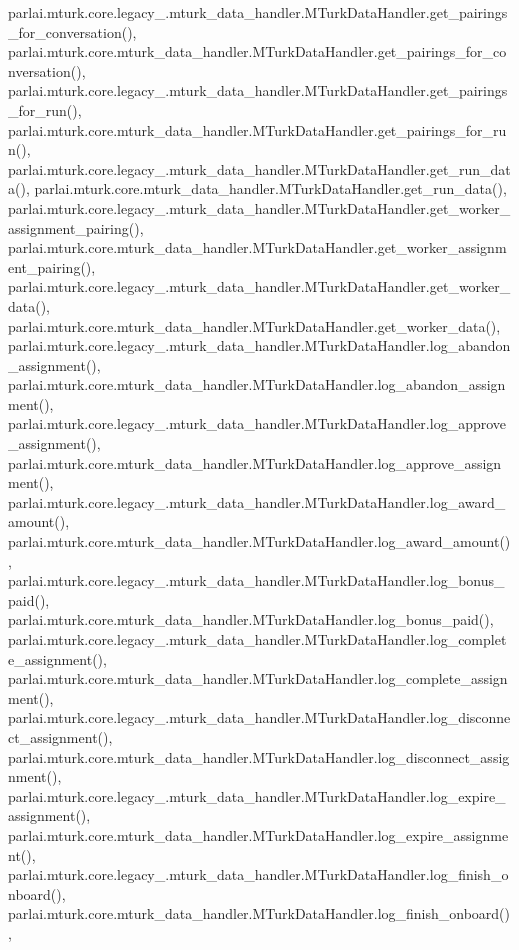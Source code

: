 parlai.\+mturk.\+core.\+legacy\+\_.\+mturk\+\_\+data\+\_\+handler.\+M\+Turk\+Data\+Handler.\+get\+\_\+pairings\+\_\+for\+\_\+conversation(), parlai.\+mturk.\+core.\+mturk\+\_\+data\+\_\+handler.\+M\+Turk\+Data\+Handler.\+get\+\_\+pairings\+\_\+for\+\_\+conversation(), parlai.\+mturk.\+core.\+legacy\+\_.\+mturk\+\_\+data\+\_\+handler.\+M\+Turk\+Data\+Handler.\+get\+\_\+pairings\+\_\+for\+\_\+run(), parlai.\+mturk.\+core.\+mturk\+\_\+data\+\_\+handler.\+M\+Turk\+Data\+Handler.\+get\+\_\+pairings\+\_\+for\+\_\+run(), parlai.\+mturk.\+core.\+legacy\+\_.\+mturk\+\_\+data\+\_\+handler.\+M\+Turk\+Data\+Handler.\+get\+\_\+run\+\_\+data(), parlai.\+mturk.\+core.\+mturk\+\_\+data\+\_\+handler.\+M\+Turk\+Data\+Handler.\+get\+\_\+run\+\_\+data(), parlai.\+mturk.\+core.\+legacy\+\_.\+mturk\+\_\+data\+\_\+handler.\+M\+Turk\+Data\+Handler.\+get\+\_\+worker\+\_\+assignment\+\_\+pairing(), parlai.\+mturk.\+core.\+mturk\+\_\+data\+\_\+handler.\+M\+Turk\+Data\+Handler.\+get\+\_\+worker\+\_\+assignment\+\_\+pairing(), parlai.\+mturk.\+core.\+legacy\+\_.\+mturk\+\_\+data\+\_\+handler.\+M\+Turk\+Data\+Handler.\+get\+\_\+worker\+\_\+data(), parlai.\+mturk.\+core.\+mturk\+\_\+data\+\_\+handler.\+M\+Turk\+Data\+Handler.\+get\+\_\+worker\+\_\+data(), parlai.\+mturk.\+core.\+legacy\+\_.\+mturk\+\_\+data\+\_\+handler.\+M\+Turk\+Data\+Handler.\+log\+\_\+abandon\+\_\+assignment(), parlai.\+mturk.\+core.\+mturk\+\_\+data\+\_\+handler.\+M\+Turk\+Data\+Handler.\+log\+\_\+abandon\+\_\+assignment(), parlai.\+mturk.\+core.\+legacy\+\_.\+mturk\+\_\+data\+\_\+handler.\+M\+Turk\+Data\+Handler.\+log\+\_\+approve\+\_\+assignment(), parlai.\+mturk.\+core.\+mturk\+\_\+data\+\_\+handler.\+M\+Turk\+Data\+Handler.\+log\+\_\+approve\+\_\+assignment(), parlai.\+mturk.\+core.\+legacy\+\_.\+mturk\+\_\+data\+\_\+handler.\+M\+Turk\+Data\+Handler.\+log\+\_\+award\+\_\+amount(), parlai.\+mturk.\+core.\+mturk\+\_\+data\+\_\+handler.\+M\+Turk\+Data\+Handler.\+log\+\_\+award\+\_\+amount(), parlai.\+mturk.\+core.\+legacy\+\_.\+mturk\+\_\+data\+\_\+handler.\+M\+Turk\+Data\+Handler.\+log\+\_\+bonus\+\_\+paid(), parlai.\+mturk.\+core.\+mturk\+\_\+data\+\_\+handler.\+M\+Turk\+Data\+Handler.\+log\+\_\+bonus\+\_\+paid(), parlai.\+mturk.\+core.\+legacy\+\_.\+mturk\+\_\+data\+\_\+handler.\+M\+Turk\+Data\+Handler.\+log\+\_\+complete\+\_\+assignment(), parlai.\+mturk.\+core.\+mturk\+\_\+data\+\_\+handler.\+M\+Turk\+Data\+Handler.\+log\+\_\+complete\+\_\+assignment(), parlai.\+mturk.\+core.\+legacy\+\_.\+mturk\+\_\+data\+\_\+handler.\+M\+Turk\+Data\+Handler.\+log\+\_\+disconnect\+\_\+assignment(), parlai.\+mturk.\+core.\+mturk\+\_\+data\+\_\+handler.\+M\+Turk\+Data\+Handler.\+log\+\_\+disconnect\+\_\+assignment(), parlai.\+mturk.\+core.\+legacy\+\_.\+mturk\+\_\+data\+\_\+handler.\+M\+Turk\+Data\+Handler.\+log\+\_\+expire\+\_\+assignment(), parlai.\+mturk.\+core.\+mturk\+\_\+data\+\_\+handler.\+M\+Turk\+Data\+Handler.\+log\+\_\+expire\+\_\+assignment(), parlai.\+mturk.\+core.\+legacy\+\_.\+mturk\+\_\+data\+\_\+handler.\+M\+Turk\+Data\+Handler.\+log\+\_\+finish\+\_\+onboard(), parlai.\+mturk.\+core.\+mturk\+\_\+data\+\_\+handler.\+M\+Turk\+Data\+Handler.\+log\+\_\+finish\+\_\+onboard(), 